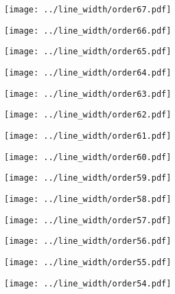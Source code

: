 \documentclass{article}
\begin{document}
\begin{figure}[H]
    \centering
    \texttt{[image: ../line\_width/order67.pdf]}
\end{figure}
\begin{figure}[H]
    \centering
    \texttt{[image: ../line\_width/order66.pdf]}
\end{figure}
\begin{figure}[H]
    \centering
    \texttt{[image: ../line\_width/order65.pdf]}
\end{figure}
\begin{figure}[H]
    \centering
    \texttt{[image: ../line\_width/order64.pdf]}
\end{figure}
\begin{figure}[H]
    \centering
    \texttt{[image: ../line\_width/order63.pdf]}
\end{figure}
\begin{figure}[H]
    \centering
    \texttt{[image: ../line\_width/order62.pdf]}
\end{figure}
\begin{figure}[H]
    \centering
    \texttt{[image: ../line\_width/order61.pdf]}
\end{figure}
\begin{figure}[H]
    \centering
    \texttt{[image: ../line\_width/order60.pdf]}
\end{figure}
\begin{figure}[H]
    \centering
    \texttt{[image: ../line\_width/order59.pdf]}
\end{figure}
\begin{figure}[H]
    \centering
    \texttt{[image: ../line\_width/order58.pdf]}
\end{figure}
\begin{figure}[H]
    \centering
    \texttt{[image: ../line\_width/order57.pdf]}
\end{figure}
\begin{figure}[H]
    \centering
    \texttt{[image: ../line\_width/order56.pdf]}
\end{figure}
\begin{figure}[H]
    \centering
    \texttt{[image: ../line\_width/order55.pdf]}
\end{figure}
\begin{figure}[H]
    \centering
    \texttt{[image: ../line\_width/order54.pdf]}
\end{figure}
\end{document}
